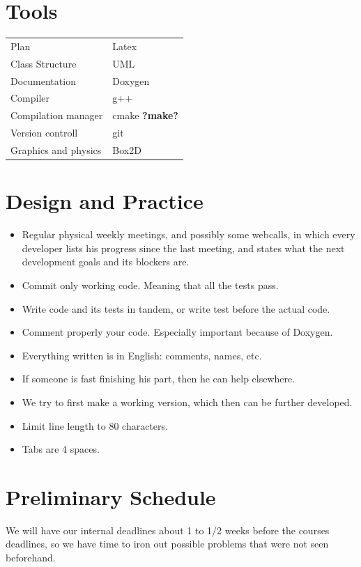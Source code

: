 \documentclass{article}
\begin{document}
\section{Tools}
\begin{tabular}{ll}
Plan                    & Latex \\
Class Structure         & UML \\
Documentation           & Doxygen \\
Compiler                & g++ \\
Compilation manager     & cmake \textbf{?make?} \\
Version controll        & git \\
Graphics and physics    & Box2D \\
\end{tabular}



\section{Design and Practice}
\begin{itemize}
\item Regular physical weekly meetings, and possibly some webcalls,
in which every developer lists his progress since the last meeting,
and states what the next development goals and its blockers are.
\item Commit only working code. Meaning that all the tests pass.
\item Write code and its tests in tandem, or write test before the actual code.
\item Comment properly your code. Especially important because of Doxygen.
\item Everything written is in English: comments, names, etc.
\item If someone is fast finishing his part, then he can help elsewhere.
\item We try to first make a working version, which then can be further
developed.
\item Limit line length to 80 characters.
\item Tabs are 4 spaces.
\end{itemize}



\section{Preliminary Schedule}
We will have our internal deadlines about 1 to 1/2 weeks before the
courses deadlines, so we have time to iron out possible problems that
were not seen beforehand.
\end{document}
